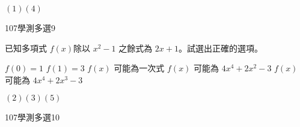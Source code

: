 \begin{QUESTIONS}
\begin{QUESTION}
\begin{QBODY}
        \end{QBODY}
        \begin{QFROMS}
        \end{QFROMS}
        \begin{QTAGS}\end{QTAGS}
        \begin{QANS}
            $(1)(4)$
        \end{QANS}
        \begin{QSOLLIST}
        \end{QSOLLIST}
        \begin{QEMPTYSPACE}
        \end{QEMPTYSPACE}
    \end{QUESTION}
    \begin{QUESTION}
        \begin{ExamInfo}{107}{學測}{多選}{9}
        \end{ExamInfo}
        \begin{ExamAnsRateInfo}{}{}{}{}
        \end{ExamAnsRateInfo}
        \begin{QBODY}
            已知多項式 $f(x)$除以 $x^2-1$ 之餘式為 $2x+1$。試選出正確的選項。
            \begin{QOPS}
                \QOP $f(0)=1$
                \QOP $f(1)=3$
                \QOP $f(x)$ 可能為一次式
                \QOP $f(x)$ 可能為 $4x^4+2x^2-3$
                \QOP $f(x)$ 可能為 $4x^4+2x^3-3$
            \end{QOPS}
        \end{QBODY}
        \begin{QFROMS}
        \end{QFROMS}
        \begin{QTAGS}\end{QTAGS}
        \begin{QANS}
            $(2)(3)(5)$
        \end{QANS}
        \begin{QSOLLIST}
        \end{QSOLLIST}
        \begin{QEMPTYSPACE}
        \end{QEMPTYSPACE}
    \end{QUESTION}
    \begin{QUESTION}
        \begin{ExamInfo}{107}{學測}{多選}{10}
        \end{ExamInfo}
        \begin{ExamAnsRateInfo}{}{}{}{}

\end{ExamAnsRateInfo}
\end{QUESTION}
\end{QUESTIONS}
